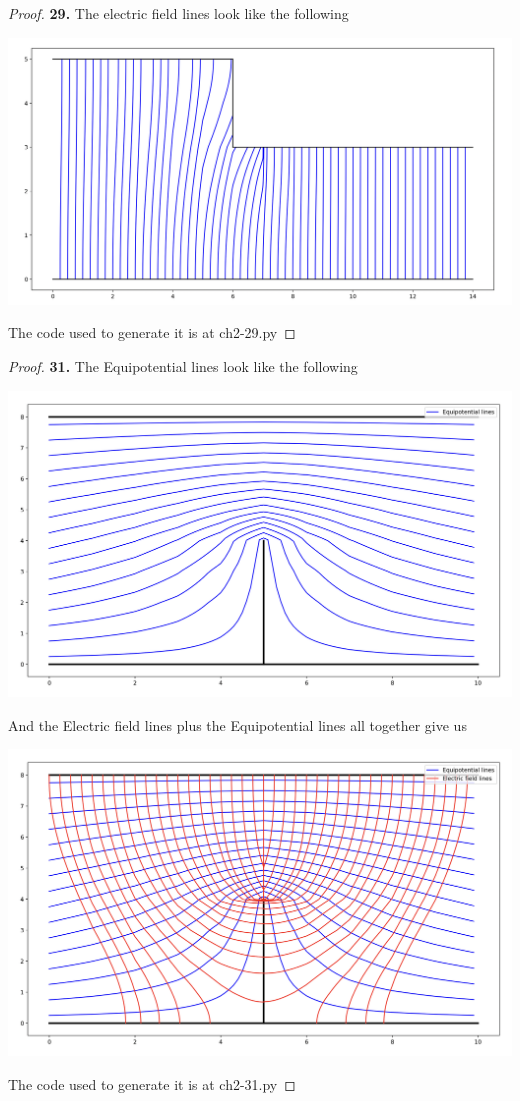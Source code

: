 \documentclass[11pt]{article}
\theoremstyle{definition}
\begin{document}
\begin{proof}{\textbf{29.}}
    The electric field lines look like the following
    \begin{center}
        \includegraphics[scale=0.3]{ch2-29.png}
    \end{center}
    The code used to generate it is at ch2-29.py
\end{proof}
\cleardoublepage
\begin{proof}{\textbf{31.}}
    The Equipotential lines look like the following 
    \begin{center}
        \includegraphics[scale=0.3]{ch2-31-1.png}
    \end{center}
    And the Electric field lines plus the Equipotential lines
    all together give us
    \begin{center}
        \includegraphics[scale=0.3]{ch2-31-2.png}
    \end{center}
    The code used to generate it is at ch2-31.py
\end{proof}
\end{document}
